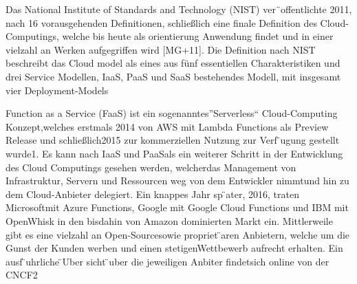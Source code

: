 Das National Institute of Standards and Technology (NIST) ver¨offentlichte 2011, nach 16 vorausgehenden Definitionen, schließlich eine finale Definition des Cloud-Computings, welche bis heute als orientierung Anwendung findet und in einer vielzahl an Werken aufgegriffen wird [MG+11]. Die Definition nach NIST beschreibt das Cloud model als eines aus fünf essentiellen Charakteristiken und drei Service Modellen, IaaS, PaaS und SaaS bestehendes Modell, mit insgesamt vier Deployment-Models

Function  as  a  Service  (FaaS)  ist  ein  sogenanntes”Serverless“  Cloud-Computing  Konzept,welches erstmals 2014 von AWS mit Lambda Functions als Preview Release und schließlich2015 zur kommerziellen Nutzung zur Verf ̈ugung gestellt wurde1.  Es kann nach IaaS und PaaSals ein weiterer Schritt in der Entwicklung des Cloud Computings gesehen werden, welcherdas Management von Infrastruktur, Servern und Ressourcen weg von dem Entwickler nimmtund hin zu dem Cloud-Anbieter delegiert.  Ein knappes Jahr sp ̈ater, 2016, traten Microsoftmit Azure Functions, Google mit Google Cloud Functions und IBM mit OpenWhisk in den bisdahin von Amazon dominierten Markt ein.  Mittlerweile gibt es eine vielzahl an Open-Sourcesowie propriet ̈aren Anbietern, welche um die Gunst der Kunden werben und einen stetigenWettbewerb aufrecht erhalten.  Ein ausf ̈uhrliche ̈Uber  sicht  ̈uber die jeweiligen Anbiter findetsich online von der CNCF2

